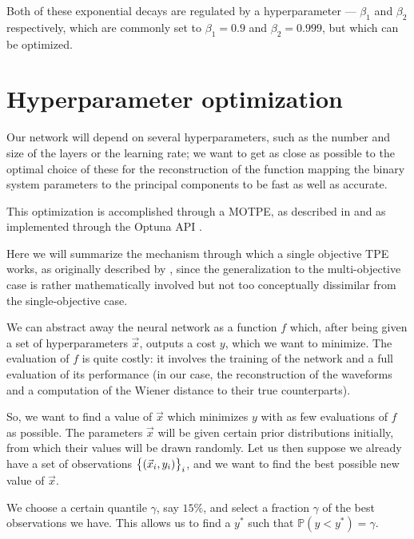 \documentclass[main.tex]{subfiles}
\begin{document}
Both of these exponential decays are regulated by a hyperparameter --- \(\beta_1\) and \(\beta_2 \) respectively, which are commonly set to \(\beta_1 = 0.9\) and \(\beta_2 = 0.999\), but which can be optimized. 

\section{Hyperparameter optimization} \label{sec:optuna}

Our network will depend on several hyperparameters, such as the number and size of the layers or the learning rate; we want to get as close as possible to the optimal choice of these for the reconstruction of the function mapping the binary system parameters to the principal components to be fast as well as accurate.

This optimization is accomplished through a \ac{MOTPE}, as described in \textcite[]{ozakiMultiobjectiveTreestructuredParzen2020} and as implemented through the Optuna API \cite[]{akibaOptunaNextgenerationHyperparameter2019}.

Here we will summarize the mechanism through which a single objective \ac{TPE} works, as originally described by \textcite[section 4]{bergstraAlgorithmsHyperParameterOptimization2011}, since
the generalization to the multi-objective case \cite[]{ozakiMultiobjectiveTreestructuredParzen2020} is rather mathematically involved but not too conceptually dissimilar from the single-objective case. 

We can abstract away the neural network as a function \(f\) which, after being given a set of hyperparameters \(\vec{x}\), outputs a cost \(y\), which we want to minimize.
The evaluation of \(f\) is quite costly: it involves the training of the network and a full evaluation of its performance (in our case, the reconstruction of the waveforms and a computation of the Wiener distance to their true counterparts).  

So, we want to find a value of \(\vec{x}\) which minimizes \(y\) with as few evaluations of \(f\) as possible. 
The parameters \(\vec{x}\) will be given certain prior distributions initially, from which their values will be drawn randomly. 
Let us then suppose we already have a set of observations \(\qty{(\vec{x}_i, y_i)}_i\), and we want to find the best possible new value of \(\vec{x}\). 

We choose a certain quantile \(\gamma\), say \(15 \%\), and select a fraction \(\gamma \) of the best observations we have. This allows us to find a \(y^{*}\) such that \(\mathbb{P}(y < y^{*}) = \gamma \).  
\end{document}
